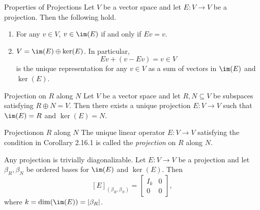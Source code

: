 \documentclass[math_245.tex]{subfiles}
\begin{document}
    \clearpage

    \begin{prop}{Properties of Projections}
        Let $V$ be a vector space and let $E: V\to V$ be a projection. Then the following hold.
        \begin{enumerate}
            \item For any $v\in V$, $v\in \im(E)$ if and only if $Ev = v$.
            \item $V = \im(E)\oplus \ker(E)$. In particular,
                \begin{equation*}
                    Ev + (v-Ev) = v\in V
                \end{equation*}
                is the unique representation for any $v\in V$ as a sum of vectors in $\im(E)$ and $\ker(E)$.
        \end{enumerate}
    \end{prop}

    \begin{cor}{Projection on $R$ along $N$}
        Let $V$ be a vector space and let $R, N\subseteq V$ be subspaces satisfying $R\oplus N = V$. Then there exists a unique projection $E:V\to V$ such that $\im(E) = R$ and $\ker(E) = N$.
    \end{cor}	

    \begin{definition}{Projection}{on $R$ along $N$}
        The unique linear operator $E:V\to V$ satisfying the condition in Corollary 2.16.1 is called the \emph{projection} on $R$ along $N$.
    \end{definition}

    \begin{remark}
        Any projection is trivially diagonalizable. Let $E: V\to V$ be a projection and let $\beta_R,\beta_N$ be ordered bases for $\im(E)$ and $\ker(E)$. Then
        \begin{equation*}
            \left[ E \right]_{\left( \beta_R, \beta_N \right)} = \begin{bmatrix} I_k & 0 \\ 0 & 0 \end{bmatrix},
        \end{equation*}
        where $k = \dim(\im(E)) = \left| \beta_R \right|$.
    \end{remark}
\end{document}
